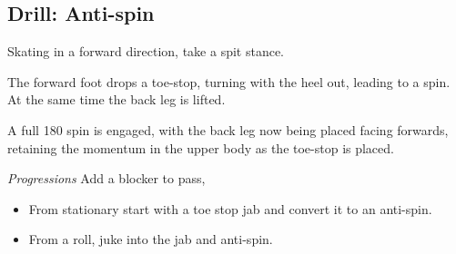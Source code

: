 \subsection*{Drill: Anti-spin}
\label{drill:footwork/antispin}

Skating in a forward direction, take a spit stance. 

The forward foot drops a toe-stop, turning with the heel out, leading to a spin. 
At the same time the back leg is lifted.

A full 180 spin is engaged, with the back leg now being placed facing forwards, retaining the momentum in the upper body as the toe-stop is placed. 

{\it Progressions}
Add a blocker to pass,
\begin{itemize}
\item From stationary start with a toe stop jab and convert it to an anti-spin.
\item From a roll, juke into the jab and anti-spin. 
\end{itemize}

 
